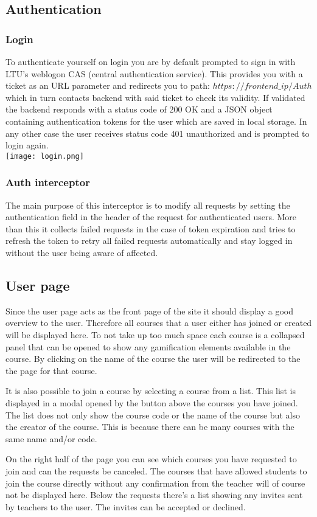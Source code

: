 \subsection{Authentication}
\subsubsection{Login}
To authenticate yourself on login you are by default prompted to sign in with LTU's weblogon CAS (central authentication service). 
This provides you with a ticket as an URL parameter and redirects you to path: $https://frontend\_ip/Auth$ which in turn contacts backend with said ticket to check its validity. If validated the backend responds with a status code of 200 OK and a JSON object containing authentication tokens for the user which are saved in local storage. In any other case the user receives status code 401 unauthorized and is prompted to login again.
\\
\texttt{[image: login.png]}

\subsubsection{Auth interceptor}
The main purpose of this interceptor is to modify all requests by setting the authentication field in the header of the request for authenticated users. More than this it collects failed requests in the case of token expiration and tries to refresh the token to retry all failed requests automatically and stay logged in without the user being aware of affected.

\subsection{User page}
Since the user page acts as the front page of the site it should display a good overview to the user. Therefore all courses that a user either has joined or created will be displayed here. To not take up too much space each course is a collapsed panel that can be opened to show any gamification elements available in the course. By clicking on the name of the course the user will be redirected to the the page for that course.

It is also possible to join a course by selecting a course from a list. This list is displayed in a modal opened by the button above the courses you have joined.  The list does not only show the course code or the name of the course but also the creator of the course. This is because there can be many courses with the same name and/or code.

On the right half of the page you can see which courses you have requested to join and can the requests be canceled. The courses that have allowed students to join the course directly without any confirmation from the teacher will of course not be displayed here. Below the requests there's a list showing any invites sent by teachers to the user. The invites can be accepted or declined.
